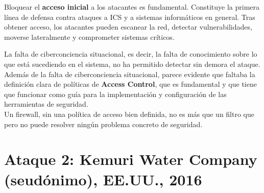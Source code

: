 Bloquear el \textbf{acceso inicial} a los atacantes es fundamental. Constituye la primera línea de defensa contra ataques a ICS y a sistemas informáticos en general. Tras obtener acceso, los atacantes pueden escanear la red, detectar vulnerabilidades, moverse lateralmente y comprometer sistemas críticos.

La falta de ciberconciencia situacional, es decir, la falta de conocimiento sobre lo que está sucediendo en el sistema, no ha permitido detectar sin demora el ataque.\\
Además de la falta de ciberconciencia situacional, parece evidente que faltaba la definición clara de políticas de \textbf{Access Control}, que es fundamental y que tiene que funcionar como guía para la implementación y configuración de las herramientas de seguridad.\\
Un firewall, sin una política de acceso bien definida, no es más que un filtro que pero no puede resolver ningún problema concreto de seguridad.
\newpage


\section{Ataque 2: Kemuri Water Company (seudónimo), EE.UU., 2016}

